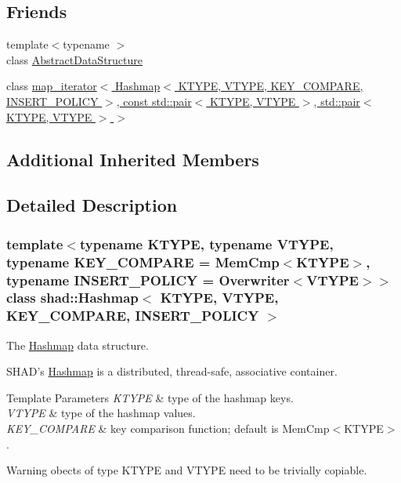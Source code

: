\subsection*{Friends}
\begin{DoxyCompactItemize}
\item 
{\footnotesize template$<$typename $>$ }\\class \hyperlink{classshad_1_1Hashmap_ab18afa4496cc863ddc11bab94b2adf57}{Abstract\-Data\-Structure}
\item 
class \hyperlink{classshad_1_1Hashmap_a92846a6772a0f2fa3e0756f5029fcb0b}{map\-\_\-iterator$<$ Hashmap$<$ K\-T\-Y\-P\-E, V\-T\-Y\-P\-E, K\-E\-Y\-\_\-\-C\-O\-M\-P\-A\-R\-E, I\-N\-S\-E\-R\-T\-\_\-\-P\-O\-L\-I\-C\-Y $>$, const std\-::pair$<$ K\-T\-Y\-P\-E, V\-T\-Y\-P\-E $>$, std\-::pair$<$ K\-T\-Y\-P\-E, V\-T\-Y\-P\-E $>$ $>$}
\end{DoxyCompactItemize}
\subsection*{Additional Inherited Members}


\subsection{Detailed Description}
\subsubsection*{template$<$typename K\-T\-Y\-P\-E, typename V\-T\-Y\-P\-E, typename K\-E\-Y\-\_\-\-C\-O\-M\-P\-A\-R\-E = Mem\-Cmp$<$\-K\-T\-Y\-P\-E$>$, typename I\-N\-S\-E\-R\-T\-\_\-\-P\-O\-L\-I\-C\-Y = Overwriter$<$\-V\-T\-Y\-P\-E$>$$>$class shad\-::\-Hashmap$<$ K\-T\-Y\-P\-E, V\-T\-Y\-P\-E, K\-E\-Y\-\_\-\-C\-O\-M\-P\-A\-R\-E, I\-N\-S\-E\-R\-T\-\_\-\-P\-O\-L\-I\-C\-Y $>$}

The \hyperlink{classshad_1_1Hashmap}{Hashmap} data structure. 

S\-H\-A\-D's \hyperlink{classshad_1_1Hashmap}{Hashmap} is a distributed, thread-\/safe, associative container. 
\begin{DoxyTemplParams}{Template Parameters}
{\em K\-T\-Y\-P\-E} & type of the hashmap keys. \\
\hline
{\em V\-T\-Y\-P\-E} & type of the hashmap values. \\
\hline
{\em K\-E\-Y\-\_\-\-C\-O\-M\-P\-A\-R\-E} & key comparison function; default is Mem\-Cmp$<$\-K\-T\-Y\-P\-E$>$. \\
\hline
\end{DoxyTemplParams}
\begin{DoxyWarning}{Warning}
obects of type K\-T\-Y\-P\-E and V\-T\-Y\-P\-E need to be trivially copiable. 
\end{DoxyWarning}


